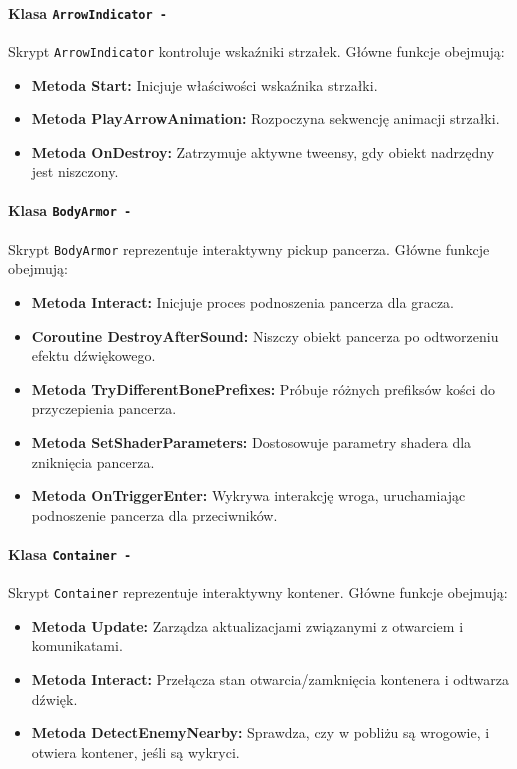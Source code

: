 \paragraph{Klasa \texttt{ArrowIndicator -}}
Skrypt \texttt{ArrowIndicator} kontroluje wskaźniki strzałek. Główne funkcje obejmują:
\begin{itemize}
  \item \textbf{Metoda Start:} Inicjuje właściwości wskaźnika strzałki.
  \item \textbf{Metoda PlayArrowAnimation:} Rozpoczyna sekwencję animacji strzałki.
  \item \textbf{Metoda OnDestroy:} Zatrzymuje aktywne tweensy, gdy obiekt nadrzędny jest niszczony.
\end{itemize}

\paragraph{Klasa \texttt{BodyArmor -}}
Skrypt \texttt{BodyArmor} reprezentuje interaktywny pickup pancerza. Główne funkcje obejmują:
\begin{itemize}
  \item \textbf{Metoda Interact:} Inicjuje proces podnoszenia pancerza dla gracza.
  \item \textbf{Coroutine DestroyAfterSound:} Niszczy obiekt pancerza po odtworzeniu efektu dźwiękowego.
  \item \textbf{Metoda TryDifferentBonePrefixes:} Próbuje różnych prefiksów kości do przyczepienia pancerza.
  \item \textbf{Metoda SetShaderParameters:} Dostosowuje parametry shadera dla zniknięcia pancerza.
  \item \textbf{Metoda OnTriggerEnter:} Wykrywa interakcję wroga, uruchamiając podnoszenie pancerza dla przeciwników.
\end{itemize}

\paragraph{Klasa \texttt{Container -}}
Skrypt \texttt{Container} reprezentuje interaktywny kontener. Główne funkcje obejmują:
\begin{itemize}
  \item \textbf{Metoda Update:} Zarządza aktualizacjami związanymi z otwarciem i komunikatami.
  \item \textbf{Metoda Interact:} Przełącza stan otwarcia/zamknięcia kontenera i odtwarza dźwięk.
  \item \textbf{Metoda DetectEnemyNearby:} Sprawdza, czy w pobliżu są wrogowie, i otwiera kontener, jeśli są wykryci.
\end{itemize}

